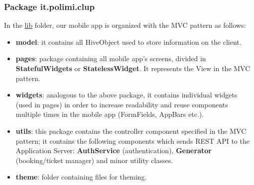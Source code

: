 \documentclass[table, 12pt]{article}
\begin{document}
\subsubsection{Package it.polimi.clup}
In the \underline{lib} folder, our mobile app is organized with the MVC pattern as follows:
\begin{itemize}
    \item \textbf{model}: it contains all HiveObject used to store information on the client.
    \item \textbf{pages}: package containing all mobile app's screens, divided in \textbf{StatefulWidgets} or \textbf{StatelessWidget}. It represents the View in the MVC pattern.
    \item \textbf{widgets}: analogous to the above package, it contains individual widgets (used in pages) in order to increase readability and reuse components multiple times in the mobile app (FormFields, AppBars etc.).
    \item \textbf{utils}: this package contains the controller component specified in the MVC pattern; it contains the following components which sends REST API to the Application Server: \textbf{AuthService} (authentication), \textbf{Generator} (booking/ticket manager) and minor utility classes.
    \item \textbf{theme}: folder containing files for theming.
\end{itemize}
\end{document}
